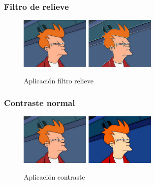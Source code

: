 \subsubsection{Filtro de relieve}
\vskip0.3cm
\begin{figure}[H]
 \centering
  \includegraphics[width=0.3\textwidth]{imagenes/Fry.jpg}
  \includegraphics[width=0.3\textwidth]{imagenes/fryRelieve.jpg}
 \caption{Aplicación filtro relieve}
 \label{diseño}
\end{figure}
\subsubsection{Contraste normal}
\vskip0.3cm
\begin{figure}[H]
 \centering
  \includegraphics[width=0.3\textwidth]{imagenes/Fry.jpg}
  \includegraphics[width=0.3\textwidth]{imagenes/fryContraste.jpg}
 \caption{Aplicación contraste}
 \label{diseño}
\end{figure}

